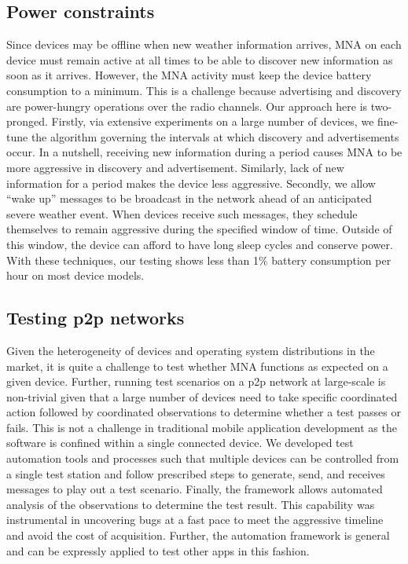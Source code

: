 \documentclass[conference]{IEEEtran}
\begin{document}
\subsection{Power constraints}
%
Since devices may be offline when new weather information
arrives, MNA on each device must remain active at all times to be able
to discover new information as soon as it arrives. However, the MNA
activity must keep the device battery consumption to a minimum. This
is a challenge because advertising and discovery are power-hungry
operations over the radio channels. Our approach here is
two-pronged. Firstly, via extensive experiments on a large number of
devices, we fine-tune the algorithm governing the intervals at which
discovery and advertisements occur. In a nutshell, receiving new
information during a period causes MNA to be more aggressive in
discovery and advertisement. Similarly, lack of new information for a
period makes the device less aggressive. Secondly, we allow ``wake
up'' messages to be broadcast in the network ahead of an anticipated
severe weather event. When devices receive such messages, they
schedule themselves to remain aggressive during the specified window
of time. Outside of this window, the device can afford to have long
sleep cycles and conserve power. With these techniques, our testing
shows less than 1\% battery consumption per hour on most device
models.
%
\subsection{Testing p2p networks}
%
Given the heterogeneity of devices and operating system
distributions in the market, it is quite a challenge to test whether
MNA functions as expected on a given device. Further, running test
scenarios on a p2p network at large-scale is non-trivial given that a
large number of devices need to take specific coordinated action
followed by coordinated observations to determine whether a test
passes or fails. This is not a challenge in traditional mobile
application development as the software is confined within a single
connected device. We developed test automation tools and processes
such that multiple devices can be controlled from a single test
station and follow prescribed steps to generate, send, and receives
messages to play out a test scenario. Finally, the framework allows
automated analysis of the observations to determine the test
result. This capability was instrumental in uncovering bugs at a fast
pace to meet the aggressive timeline and avoid the cost of
acquisition. Further, the automation framework is general and can be
expressly applied to test other apps in this fashion.
%
\end{document}
